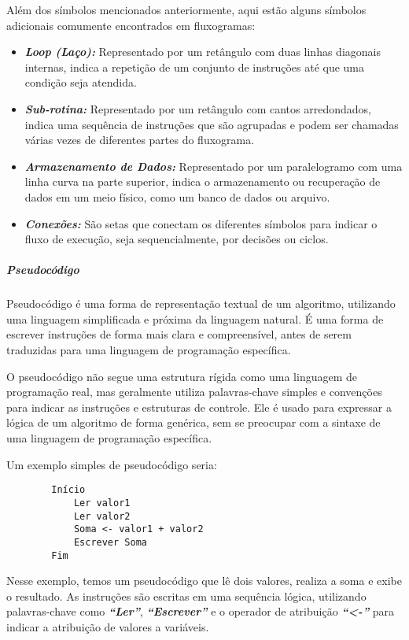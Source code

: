 \documentclass[a4paper, 12pt, onecolumn,singlespacing]{article}
\begin{document}
	Além dos símbolos mencionados anteriormente, aqui estão alguns símbolos adicionais comumente encontrados em fluxogramas:
	
	\begin{itemize}
	
		\item \textbf{\textit{Loop (Laço):}} Representado por um retângulo com duas linhas diagonais internas, indica a repetição de um conjunto de instruções até que uma condição seja atendida.
		
		\item \textbf{\textit{Sub-rotina:}} Representado por um retângulo com cantos arredondados, indica uma sequência de instruções que são agrupadas e podem ser chamadas várias vezes de diferentes partes do fluxograma.
		
		\item \textbf{\textit{Armazenamento de Dados:}} Representado por um paralelogramo com uma linha curva na parte superior, indica o armazenamento ou recuperação de dados em um meio físico, como um banco de dados ou arquivo.
		
		\item \textbf{\textit{Conexões:}} São setas que conectam os diferentes símbolos para indicar o fluxo de execução, seja sequencialmente, por decisões ou ciclos.
		
	\end{itemize}

	\subparagraph{Pseudocódigo}
	
	Pseudocódigo é uma forma de representação textual de um algoritmo, utilizando uma linguagem simplificada e próxima da linguagem natural. É uma forma de escrever instruções de forma mais clara e compreensível, antes de serem traduzidas para uma linguagem de programação específica.
	
	O pseudocódigo não segue uma estrutura rígida como uma linguagem de programação real, mas geralmente utiliza palavras-chave simples e convenções para indicar as instruções e estruturas de controle. Ele é usado para expressar a lógica de um algoritmo de forma genérica, sem se preocupar com a sintaxe de uma linguagem de programação específica.
	
	Um exemplo simples de pseudocódigo seria:
	
	\begin{verbatim}
		Início
			Ler valor1
			Ler valor2
			Soma <- valor1 + valor2
			Escrever Soma
		Fim
	\end{verbatim}
	
	Nesse exemplo, temos um pseudocódigo que lê dois valores, realiza a soma e exibe o resultado. As instruções são escritas em uma sequência lógica, utilizando palavras-chave como \textbf{\textit{``Ler''}}, \textbf{\textit{``Escrever''}} e o operador de atribuição \textbf{\textit{``<-''}} para indicar a atribuição de valores a variáveis.
	
\end{document}
